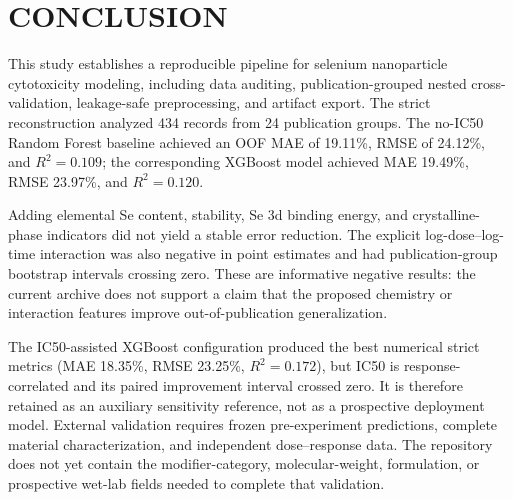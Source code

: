 \section{CONCLUSION}

This study establishes a reproducible pipeline for selenium nanoparticle cytotoxicity modeling, including data auditing, publication-grouped nested cross-validation, leakage-safe preprocessing, and artifact export. The strict reconstruction analyzed 434 records from 24 publication groups. The no-IC50 Random Forest baseline achieved an OOF MAE of 19.11\%, RMSE of 24.12\%, and $R^2=0.109$; the corresponding XGBoost model achieved MAE 19.49\%, RMSE 23.97\%, and $R^2=0.120$.

Adding elemental Se content, stability, Se 3d binding energy, and crystalline-phase indicators did not yield a stable error reduction. The explicit log-dose--log-time interaction was also negative in point estimates and had publication-group bootstrap intervals crossing zero. These are informative negative results: the current archive does not support a claim that the proposed chemistry or interaction features improve out-of-publication generalization.

The IC50-assisted XGBoost configuration produced the best numerical strict metrics (MAE 18.35\%, RMSE 23.25\%, $R^2=0.172$), but IC50 is response-correlated and its paired improvement interval crossed zero. It is therefore retained as an auxiliary sensitivity reference, not as a prospective deployment model. External validation requires frozen pre-experiment predictions, complete material characterization, and independent dose--response data. The repository does not yet contain the modifier-category, molecular-weight, formulation, or prospective wet-lab fields needed to complete that validation.
